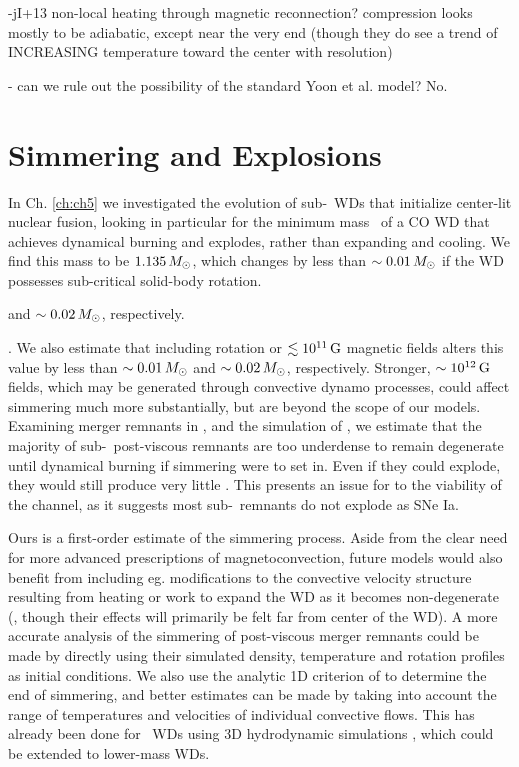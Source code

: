 -jI+13 non-local heating through magnetic reconnection?  compression looks mostly to be adiabatic, except near the very end (though they do see a trend of INCREASING temperature toward the center with resolution)

- can we rule out the possibility of the standard Yoon et al. model?  No.

\section{Simmering and Explosions}

In Ch. \ref{ch:ch5} we investigated the evolution of sub-\Mch\ WDs that initialize center-lit nuclear fusion, looking in particular for the minimum mass \Mcrit\ of a CO WD that achieves dynamical burning and explodes, rather than expanding and cooling.  We find this mass to be $1.135\,\Msun$, which changes by less than $\sim0.01\,\Msun$ if the WD possesses sub-critical solid-body rotation.  

and $\sim0.02\,\Msun$, respectively.

.  We also estimate that including rotation or $\lesssim 10^{11}\,\mathrm{G}$ magnetic fields alters this value by less than $\sim0.01\,\Msun$ and $\sim0.02\,\Msun$, respectively.  Stronger, $\sim10^{12}\,\mathrm{G}$ fields, which may be generated through convective dynamo processes, could affect simmering much more substantially, but are beyond the scope of our models.  Examining merger remnants in \citeal{zhu+13}, and the simulation of \cite{ji+13}, we estimate that the majority of sub-\Mch\ post-viscous remnants are too underdense to remain degenerate until dynamical burning if simmering were to set in.  Even if they could explode, they would still produce very little \Ni.  This presents an issue for to the viability of the \citeal{vkercj10} channel, as it suggests most sub-\Mch\ remnants do not explode as SNe Ia.


Ours is a first-order estimate of the simmering process.  Aside from the clear need for more advanced prescriptions of magnetoconvection, future models would also benefit from including eg. modifications to the convective velocity structure resulting from heating or work to expand the WD as it becomes non-degenerate (\citeal{piroc08}, though their effects will primarily be felt far from center of the WD).  A more accurate analysis of the simmering of post-viscous merger remnants could be made by directly using their simulated density, temperature and rotation profiles as initial conditions.  We also use the analytic 1D criterion of \citeal{wooswk04} to determine the end of simmering, and better estimates can be made by taking into account the range of temperatures and velocities of individual convective flows.  This has already been done for \Mch\ WDs using 3D hydrodynamic simulations \citep{kuhlwg06, zing+09, zing+11, nona+12}, which could be extended to lower-mass WDs.

